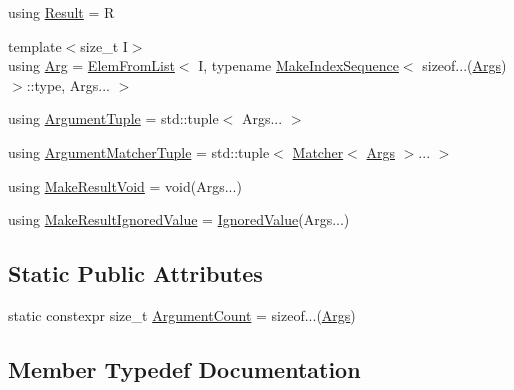\begin{DoxyCompactItemize}
\item 
using \mbox{\hyperlink{structtesting_1_1internal_1_1_function_3_01_r_07_args_8_8_8_08_4_a71efbc408f9ce64e36e2cc41df0da194}{Result}} = R
\item 
{\footnotesize template$<$size\+\_\+t I$>$ }\\using \mbox{\hyperlink{structtesting_1_1internal_1_1_function_3_01_r_07_args_8_8_8_08_4_a2f31086b21cd71eb6c855b2835c16878}{Arg}} = \mbox{\hyperlink{structtesting_1_1internal_1_1_elem_from_list}{Elem\+From\+List}}$<$ I, typename \mbox{\hyperlink{structtesting_1_1internal_1_1_make_index_sequence}{Make\+Index\+Sequence}}$<$ sizeof...(\mbox{\hyperlink{namespacetesting_aaca153f67b689b8b9d5b8c67ecf8cee4}{Args}})$>$\+::type, Args... $>$
\item 
using \mbox{\hyperlink{structtesting_1_1internal_1_1_function_3_01_r_07_args_8_8_8_08_4_afc6bddfcfc78f9308c268123ebc2a99b}{Argument\+Tuple}} = std\+::tuple$<$ Args... $>$
\item 
using \mbox{\hyperlink{structtesting_1_1internal_1_1_function_3_01_r_07_args_8_8_8_08_4_aa1b4dca988b45fea2307518af5ac8a09}{Argument\+Matcher\+Tuple}} = std\+::tuple$<$ \mbox{\hyperlink{classtesting_1_1_matcher}{Matcher}}$<$ \mbox{\hyperlink{namespacetesting_aaca153f67b689b8b9d5b8c67ecf8cee4}{Args}} $>$... $>$
\item 
using \mbox{\hyperlink{structtesting_1_1internal_1_1_function_3_01_r_07_args_8_8_8_08_4_a763920d3647641e1100bc4ade26d1d0c}{Make\+Result\+Void}} = void(Args...)
\item 
using \mbox{\hyperlink{structtesting_1_1internal_1_1_function_3_01_r_07_args_8_8_8_08_4_a23361a5e5eb49aad2e1dfe784e60b5da}{Make\+Result\+Ignored\+Value}} = \mbox{\hyperlink{classtesting_1_1internal_1_1_ignored_value}{Ignored\+Value}}(Args...)
\end{DoxyCompactItemize}
\subsection*{Static Public Attributes}
\begin{DoxyCompactItemize}
\item 
static constexpr size\+\_\+t \mbox{\hyperlink{structtesting_1_1internal_1_1_function_3_01_r_07_args_8_8_8_08_4_a9fbf56d693d099df9f23ad175ccef781}{Argument\+Count}} = sizeof...(\mbox{\hyperlink{namespacetesting_aaca153f67b689b8b9d5b8c67ecf8cee4}{Args}})
\end{DoxyCompactItemize}


\subsection{Member Typedef Documentation}
\mbox{\label{structtesting_1_1internal_1_1_function_3_01_r_07_args_8_8_8_08_4_a2f31086b21cd71eb6c855b2835c16878}} 
